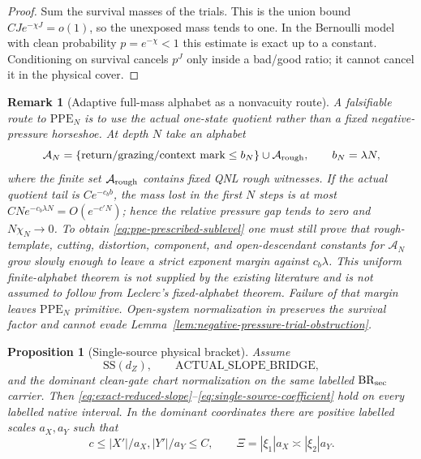 \documentclass[11pt]{article}
\newtheorem{proposition}[theorem]{Proposition}
\newtheorem{remark}[theorem]{Remark}
\begin{document}
\begin{proof}
Sum the survival masses of the trials.  This is the union bound
$CJ e^{-\chi J}=o(1)$, so the unexposed mass tends to one.  In the Bernoulli
model with clean probability $p=e^{-\chi}<1$ this estimate is exact up to a
constant.  Conditioning on survival cancels $p^J$ only inside a bad/good
ratio; it cannot cancel it in the physical cover.
\end{proof}

\begin{remark}[Adaptive full-mass alphabet as a nonvacuity route]
\label{rem:high-pressure-clean-route}
A falsifiable route to $\mathrm{PPE}_{N}$ is to use the actual one-state
quotient rather than a fixed negative-pressure horseshoe.  At depth $N$ take
an alphabet
\[
 \mathcal A_N=\{\text{return/grazing/context mark}\le b_N\}
 \cup\mathcal A_{\rm rough},\qquad b_N=\lambda N,
\]
where the finite set $\mathcal A_{\rm rough}$ contains fixed QNL rough
witnesses.  If the actual quotient tail is $Ce^{-c_b b}$, the mass lost in
the first $N$ steps is at most
$CN e^{-c_b\lambda N}=O(e^{-c'N})$; hence the relative pressure gap tends to
zero and $N\chi_N\to0$.  To obtain \eqref{eq:ppe-prescribed-sublevel} one
must still prove that rough-template, cutting, distortion, component, and
open-descendant constants for $\mathcal A_N$ grow slowly enough to leave a
strict exponent margin against $c_b\lambda$.  This uniform finite-alphabet
theorem is not supplied by the existing literature and is not assumed to
follow from Leclerc's fixed-alphabet theorem.  Failure of that margin leaves
$\mathrm{PPE}_{N}$ primitive.  Open-system normalization in
\cite{CanestrariHoles,DLreview} preserves the survival factor and cannot
evade Lemma~\ref{lem:negative-pressure-trial-obstruction}.
\end{remark}

\begin{proposition}[Single-source physical bracket]
\label{prop:exact-reduced-slope}
Assume
\[
 \mathrm{SS}(d_Z),\qquad
 \mathrm{ACTUAL\_SLOPE\_BRIDGE},
\]
and the dominant clean-gate chart normalization on the same labelled
$\mathrm{BR}_{\rm sec}$ carrier.  Then
\eqref{eq:exact-reduced-slope}--\eqref{eq:single-source-coefficient} hold on
every labelled native interval.  In the dominant coordinates there are
positive labelled scales $a_X,a_Y$ such that
\begin{equation}
\label{eq:dominant-coordinate-normalization}
 c\le |X'|/a_X,|Y'|/a_Y\le C,
 \qquad \Xi=|\xi_1|a_X\asymp|\xi_2|a_Y.
\end{equation}
\end{proposition}
\end{document}
